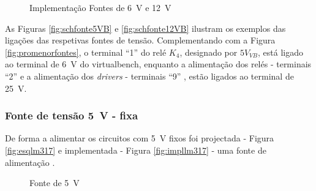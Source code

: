 \begin{figure}[hbtp]
	\centering%
		\centering
		\qquad
		\caption{Implementação Fontes de \SI{6}{\volt} e \SI{12}{\volt}}%
		\label{fig:fontes6-12}%
	\end{figure}

As Figuras \ref{fig:schfonte5VB} e \ref{fig:schfonte12VB} ilustram os exemplos das ligações das respetivas fontes de tensão. Complementando com a Figura \ref{fig:promenorfontes}, o terminal ``1'' do relé $K_{4}$, designado por $5V_{VB}$, está ligado ao terminal de \SI{6}{\volt} do \acrshort{virtualbench}, enquanto a alimentação dos relés -  terminais ``2'' e a alimentação dos \textit{drivers} -  terminais ``9'' , estão ligados ao terminal de \SI{25}{\volt}. 

\subsubsection{Fonte de tensão \SI{5}{\volt} - fixa}
De forma a alimentar os circuitos com \SI{5}{\volt} fixos foi projectada - Figura \ref{fig:esqlm317} e implementada - Figura \ref{fig:impllm317} - uma fonte de alimentação \cite{LM317}.

\begin{figure}[hbtp]
	\centering%
		\centering
		\qquad
		\caption{Fonte de \SI{5}{\volt} }%
		\label{fig:fonte5V}%
	\end{figure}

